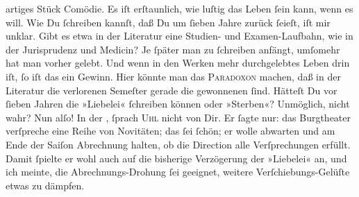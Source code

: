 \begin{ledgroupsized}[t]{13cm}
               artiges Stück Comödie. Es iſt erſtaunlich, wie luſtig das Leben ſein kann, wenn {\pb}es will.\pend
           \pstart
           Wie Du ſchreiben kannſt, daß Du um ſieben Jahre zurück ſeieſt, iſt mir unklar. Gibt
               es etwa in der Literatur eine Studien- und Examen-Laufbahn, wie in der Jurisprudenz
               und Medicin? Je ſpäter man zu ſchreiben anfängt, umſomehr hat man vorher gelebt. Und
               wenn in den Werken mehr durchgelebtes Leben drin iſt, ſo iſt das ein Gewinn. Hier
               könnte man das \textsc{Paradoxon} machen, daß in der Literatur die
               verlorenen Semeſter gerade die gewonnenen ſind. Hätteſt Du vor ſieben Jahren {\pb}die »Liebelei«
               ſchreiben können oder »Sterben«? Unmöglich,
               nicht wahr? Nun alſo!\pend
           \pstart
           In der \label{K_L02748-5v}\label{K_L02748-5h}, ſprach \textsc{Uhl} nicht von Dir. Er ſagte nur: das Burgtheater verſpreche eine Reihe von Novitäten; das ſei ſchön; er wolle
               abwarten und am Ende der Saiſon Abrechnung halten, ob die Direction alle Verſprechungen erfüllt.
               Damit ſpielte er wohl auch auf die bisherige Verzögerung der »Liebelei« an, und ich meinte, {\pb}die Abrechnungs-Drohung ſei geeignet, weitere
               Verſchiebungs-Gelüſte etwas zu dämpfen.\pend

\end{ledgroupsized}
